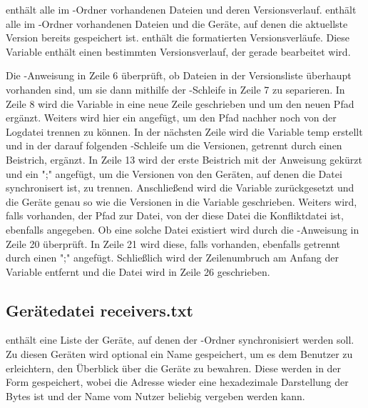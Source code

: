\begin{description}
	 enthält alle im \sblit-Ordner vorhandenen Dateien und deren Versionsverlauf.
	 enthält alle im \sblit-Ordner vorhandenen Dateien und die Geräte, auf denen die aktuellste Version bereits gespeichert ist.
	 enthält die formatierten Versionsverläufe.
	Diese Variable enthält einen bestimmten Versionsverlauf, der gerade bearbeitet wird.
\end{description}
Die -Anweisung in Zeile 6 überprüft, ob Dateien in der Versionsliste  überhaupt vorhanden sind, um sie dann mithilfe der -Schleife in Zeile 7 zu separieren. In Zeile 8 wird die  Variable in eine neue Zeile geschrieben und um den neuen Pfad ergänzt. Weiters wird hier ein \code{=} angefügt, um den Pfad nachher noch von der Logdatei trennen zu können. In der nächsten Zeile wird die Variable temp erstellt und in der darauf folgenden -Schleife um die Versionen, getrennt durch einen Beistrich, ergänzt. In Zeile 13 wird der erste Beistrich mit der Anweisung  gekürzt und ein ";" angefügt, um die Versionen von den Geräten, auf denen die Datei synchronisert ist, zu trennen. Anschließend wird die Variable  zurückgesetzt und die Geräte genau so wie die Versionen in die Variable  geschrieben. Weiters wird, falls vorhanden, der Pfad zur Datei, von der diese Datei die Konfliktdatei ist, ebenfalls angegeben. Ob eine solche Datei existiert wird durch die -Anweisung in Zeile 20 überprüft. In Zeile 21 wird diese, falls vorhanden, ebenfalls getrennt durch einen ";" angefügt. Schließlich wird der Zeilenumbruch am Anfang der Variable  entfernt und die Datei wird in Zeile 26 geschrieben.

\subsection{Gerätedatei receivers.txt} \label{receivers}
 enthält eine Liste der Geräte, auf denen der \sblit-Ordner synchronisiert werden soll. Zu diesen Geräten wird optional ein Name gespeichert, um es dem Benutzer zu erleichtern, den Überblick über die Geräte zu bewahren. Diese werden in der Form  gespeichert, wobei die Adresse wieder eine hexadezimale Darstellung der Bytes ist und der Name vom Nutzer beliebig vergeben werden kann.

